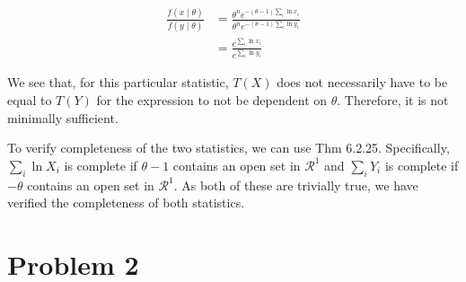 \documentclass[11pt]{article}
\begin{document}
\begin{align*}
  \frac{f(x \mid \theta)}{f(y \mid \theta)} &= \frac{\theta^n
                                              e^{-(\theta-1)\sum_i
                                              \ln{x_i}}}{\theta^n
                                              e^{-(\theta-1) \sum_i
                                              \ln{y_i}}} \\
                                            &= \frac{e^{\sum_i
                                              \ln{x_i}}}{e^{\sum_i
                                              \ln{y_i}}}
\end{align*}

We see that, for this particular statistic, $T(X)$ does not
necessarily have to be equal to $T(Y)$ for the expression to not be
dependent on $\theta$.  Therefore, it is not minimally sufficient.

To verify completeness of the two statistics, we can use Thm 6.2.25.
Specifically, $\sum_i \ln{X_i}$ is complete if $\theta -1$ contains an
open set in $\mathcal{R}^1$ and $\sum_i Y_i$ is complete if $-\theta$
contains an open set in $\mathcal{R}^1$.  As both of these are
trivially true, we have verified the completeness of both statistics.

\section*{Problem 2}
\end{document}
